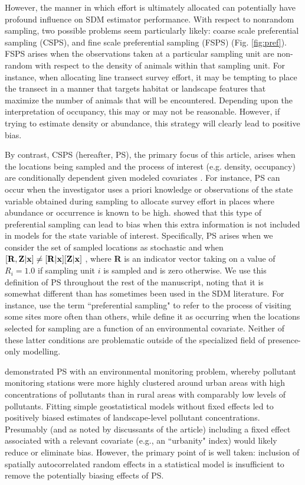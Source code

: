 \documentclass[times,mee,doublespace,]{besauth2}
\begin{document}
However, the manner in which effort is ultimately allocated can potentially have profound influence on SDM estimator performance.  With respect to nonrandom sampling, two possible problems seem particularly likely: coarse scale preferential sampling (CSPS), and fine scale preferential sampling (FSPS) (Fig. \ref{fig:pref}).  FSPS arises when the observations taken at a  particular sampling unit are non-random with respect to the density of animals within that sampling unit.  For instance, when allocating line transect survey effort, it may be tempting to place the transect in a manner that targets habitat or landscape features that maximize the number of animals that will be encountered.  Depending upon the interpretation of occupancy, this may or may not be reasonable.  However, if trying to estimate density or abundance, this strategy will clearly lead to positive bias.

By contrast, CSPS (hereafter, PS), the primary focus of this article, arises when the locations being sampled and the process of interest (e.g. density, occupancy) are conditionally dependent given modeled covariates \citep{DiggleEtAl2010}.  For instance, PS can occur when the investigator uses a priori knowledge or observations of the state variable obtained during sampling to allocate survey effort in places where abundance or occurrence is known to be high. \citet{DiggleEtAl2010} showed that this type of preferential sampling can lead to bias when this extra information is not included in models for the state variable of interest.  Specifically, PS arises when we consider the set of sampled locations as stochastic and when $[{\bf R},{\bf Z} | {\bf x}] \neq [{\bf R}|{\bf x}][{\bf Z}|{\bf x}]$ \citep{DiggleEtAl2010}, where \textbf{R} is an indicator vector taking on a value of $R_i = 1.0$ if sampling unit $i$ is sampled and is zero otherwise.  We use this definition of PS throughout the rest of the manuscript, noting that it is somewhat different than has sometimes been used in the SDM literature.  For instance, \citet{MerckxEtAl2011} use the term ``preferential sampling" to refer to the process of visiting some sites more often than others, while \citet{ManceurKuhn2014} define it as occurring when the locations selected for sampling are a function of an environmental covariate.  Neither of these latter conditions are problematic outside of the specialized field of presence-only modelling.

\citet{DiggleEtAl2010} demonstrated PS with an environmental monitoring problem, whereby pollutant monitoring stations were more highly clustered around urban areas with high concentrations of pollutants than in rural areas with comparably low levels of pollutants.  Fitting simple geostatistical models without fixed effects led to positively biased estimates of landscape-level pollutant concentrations.  Presumably (and as noted by discussants of the article) including a fixed effect associated with a relevant covariate (e.g., an ``urbanity" index) would likely reduce or eliminate bias.  However, the primary point of \citet{DiggleEtAl2010} is well taken: inclusion of spatially autocorrelated random effects in a statistical model is insufficient to remove the potentially biasing effects of PS.
\end{document}
